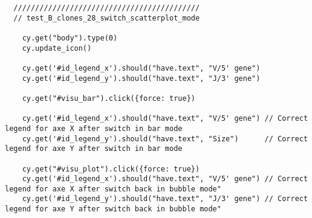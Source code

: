 \begin{verbatim}
  ///////////////////////////////////////////
  // test_B_clones_28_switch_scatterplot_mode

    cy.get("body").type(0)
    cy.update_icon()

    cy.get('#id_legend_x').should("have.text", "V/5' gene")
    cy.get('#id_legend_y').should("have.text", "J/3' gene")

    cy.get("#visu_bar").click({force: true})

    cy.get('#id_legend_x').should("have.text", "V/5' gene") // Correct legend for axe X after switch in bar mode
    cy.get('#id_legend_y').should("have.text", "Size")      // Correct legend for axe Y after switch in bar mode

    cy.get("#visu_plot").click({force: true})
    cy.get('#id_legend_x').should("have.text", "V/5' gene") // Correct legend for axe X after switch back in bubble mode"
    cy.get('#id_legend_y').should("have.text", "J/3' gene") // Correct legend for axe Y after switch back in bubble mode"


\end{verbatim}



